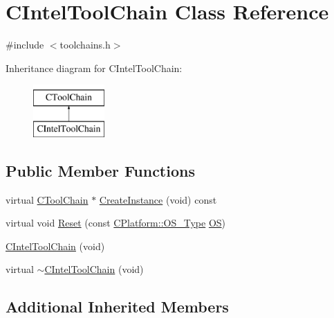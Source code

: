 \hypertarget{classCIntelToolChain}{\section{C\-Intel\-Tool\-Chain Class Reference}
\label{classCIntelToolChain}
}


{\ttfamily \#include $<$toolchains.\-h$>$}

Inheritance diagram for C\-Intel\-Tool\-Chain\-:\begin{figure}[H]
\begin{center}
\leavevmode
\includegraphics[height=2.000000cm]{db/dbe/classCIntelToolChain}
\end{center}
\end{figure}
\subsection*{Public Member Functions}
\begin{DoxyCompactItemize}
\item 
virtual \hyperlink{classCToolChain}{C\-Tool\-Chain} $\ast$ \hyperlink{classCIntelToolChain_a75365a2d8de5733f902e47d07a93fe45}{Create\-Instance} (void) const 
\item 
virtual void \hyperlink{classCIntelToolChain_a96bed03faaf53341c0b046c7163c9705}{Reset} (const \hyperlink{classCPlatform_a2fb735c63c53052f79629e338bb0f535}{C\-Platform\-::\-O\-S\-\_\-\-Type} \hyperlink{classCToolChain_abe4054d9081351e099163e2c53b260f8}{O\-S})
\item 
\hyperlink{classCIntelToolChain_a70cb7ff6ede35c56ddc30dd53cdc80ca}{C\-Intel\-Tool\-Chain} (void)
\item 
virtual \hyperlink{classCIntelToolChain_ad8857b58405ee3a6d2f62dff68710927}{$\sim$\-C\-Intel\-Tool\-Chain} (void)
\end{DoxyCompactItemize}
\subsection*{Additional Inherited Members}



